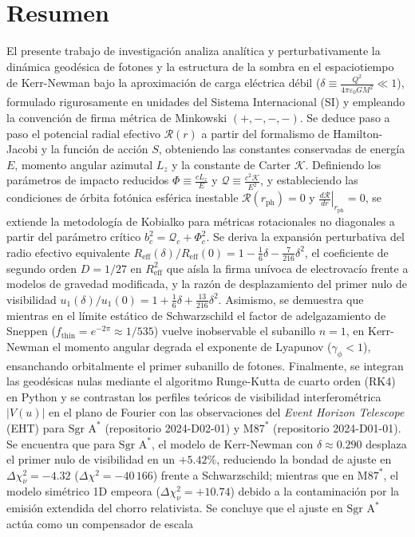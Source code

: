 \chapter*{\hfill{\centering Resumen}\hfill}
\vspace{0.5cm}
\justify
\normalsize

El presente trabajo de investigación analiza analítica y perturbativamente la dinámica geodésica de fotones y la estructura de la sombra en el espaciotiempo de Kerr-Newman bajo la aproximación de carga eléctrica débil ($\delta \equiv \frac{Q^2}{4\pi\varepsilon_0 G M^2} \ll 1$), formulado rigurosamente en unidades del Sistema Internacional (SI) y empleando la convención de firma métrica de Minkowski $(+,-,-,-)$. Se deduce paso a paso el potencial radial efectivo $\mathcal{R}(r)$ a partir del formalismo de Hamilton-Jacobi y la función de acción $S$, obteniendo las constantes conservadas de energía $E$, momento angular azimutal $L_z$ y la constante de Carter $\mathcal{K}$. Definiendo los parámetros de impacto reducidos $\Phi \equiv \frac{c L_z}{E}$ y $\mathcal{Q} \equiv \frac{c^2 \mathcal{K}}{E^2}$, y estableciendo las condiciones de órbita fotónica esférica inestable $\mathcal{R}(r_{\mathrm{ph}}) = 0$ y $\left.\frac{d\mathcal{R}}{dr}\right|_{r_{\mathrm{ph}}} = 0$, se extiende la metodología de Kobialko para métricas rotacionales no diagonales a partir del parámetro crítico $b_c^2 = \mathcal{Q}_c + \Phi_c^2$. Se deriva la expansión perturbativa del radio efectivo equivalente $R_{\mathrm{eff}}(\delta)/R_{\mathrm{eff}}(0) = 1 - \frac{1}{6}\delta - \frac{7}{216}\delta^2$, el coeficiente de segundo orden $D = 1/27$ en $R_{\mathrm{eff}}^2$ que aísla la firma unívoca de electrovacío frente a modelos de gravedad modificada, y la razón de desplazamiento del primer nulo de visibilidad $u_1(\delta)/u_1(0) = 1 + \frac{1}{6}\delta + \frac{13}{216}\delta^2$. Asimismo, se demuestra que mientras en el límite estático de Schwarzschild el factor de adelgazamiento de Sneppen ($f_{\mathrm{thin}} = e^{-2\pi} \approx 1/535$) vuelve inobservable el subanillo $n=1$, en Kerr-Newman el momento angular degrada el exponente de Lyapunov ($\gamma_\phi < 1$), ensanchando orbitalmente el primer subanillo de fotones. Finalmente, se integran las geodésicas nulas mediante el algoritmo Runge-Kutta de cuarto orden (RK4) en Python y se contrastan los perfiles teóricos de visibilidad interferométrica $|V(u)|$ en el plano de Fourier con las observaciones del \textit{Event Horizon Telescope} (EHT) para $\text{Sgr A}^*$ (repositorio 2024-D02-01) y $\text{M87}^*$ (repositorio 2024-D01-01). Se encuentra que para $\text{Sgr A}^*$, el modelo de Kerr-Newman con $\delta \approx 0.290$ desplaza el primer nulo de visibilidad en un $+5.42\%$, reduciendo la bondad de ajuste en $\Delta\chi^2_\nu = -4.32$ ($\Delta\chi^2 = -40\,166$) frente a Schwarzschild; mientras que en $\text{M87}^*$, el modelo simétrico 1D empeora ($\Delta\chi^2_\nu = +10.74$) debido a la contaminación por la emisión extendida del chorro relativista. Se concluye que el ajuste en $\text{Sgr A}^*$ actúa como un compensador de escala 